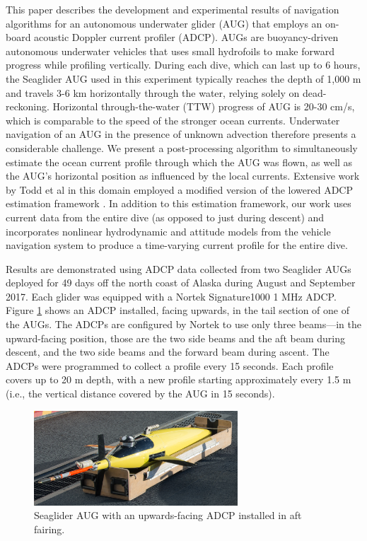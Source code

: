 

\newpage

This paper describes the development and experimental results of navigation algorithms for an autonomous underwater glider (AUG) that employs an on-board acoustic Doppler current profiler (ADCP). AUGs are buoyancy-driven autonomous underwater vehicles that uses small hydrofoils to make forward progress while profiling vertically. During each dive, which can last up to 6 hours, the Seaglider AUG used in this experiment typically reaches the depth of 1,000 m and travels 3-6 km horizontally through the water, relying solely on dead-reckoning. Horizontal through-the-water (TTW) progress of AUG is 20-30 cm/s, which is comparable to the speed of the stronger ocean currents. Underwater navigation of an AUG in the presence of unknown advection therefore presents a considerable challenge. We present a post-processing algorithm to simultaneously estimate the ocean current profile through which the AUG was flown, as well as the AUG's horizontal position as influenced by the local currents. Extensive work by Todd et al in this domain employed a modified version of the lowered ADCP estimation framework \cite{Todd2017,Todd2011}.  In addition to this estimation framework, our work uses current data from the entire dive (as opposed to just during descent) and incorporates nonlinear hydrodynamic and attitude models from the vehicle navigation system to produce a time-varying current profile for the entire dive.

Results are demonstrated using ADCP data collected from two Seaglider AUGs deployed for 49 days off the north coast of Alaska during August and September 2017. Each glider was equipped with a Nortek Signature1000 1 MHz ADCP. Figure \ref{fig.SG} shows an ADCP installed, facing upwards, in the tail section of one of the AUGs. The ADCPs are configured by Nortek to use only three beams---in the upward-facing position, those are the two side beams and the aft beam during descent, and the two side beams and the forward beam during ascent. The ADCPs were programmed to collect a profile every 15 seconds. Each profile covers up to 20 m depth, with a new profile starting approximately every 1.5 m (i.e., the vertical distance covered by the AUG in 15 seconds).

\begin{figure}[!ht]
  \centering
  \includegraphics[width=3.0in]{./figs/Gliders_hires-99_crop.jpg}
  \caption{Seaglider AUG with an upwards-facing ADCP installed in aft fairing.}
  \label{fig.SG}
  \vspace{-0.2in}
\end{figure}

